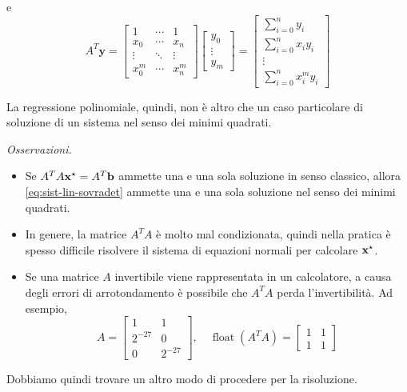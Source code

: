 e
\[
A^T\mathbf y=\begin{bmatrix}
        1 & \cdots & 1 \\
        x_0 & \cdots & x_n \\
        \vdots & \ddots & \vdots \\
        x_0^m & \cdots & x_n^m
    \end{bmatrix}\begin{bmatrix}
        y_0\\
        \vdots\\
        y_m
    \end{bmatrix}=\begin{bmatrix}
\sum ^{n}_{i=0} y_{i}\\
\sum ^{n}_{i=0} x_{i} y_{i}\\
\vdots \\
\sum ^{n}_{i=0} x^{m}_{i} y_{i}
\end{bmatrix}
\]

La regressione polinomiale, quindi, non è altro che un caso particolare di soluzione di un sistema nel senso dei minimi quadrati.

\textit{Osservazioni.}
\begin{itemize}
    \item Se $A^{T} A\mathbf{x}^{\star } =A^{T}\mathbf{b}$ ammette una e una sola soluzione in senso classico, allora \eqref{eq:sist-lin-sovradet} ammette una e una sola soluzione nel senso dei minimi quadrati.
    \item In genere, la matrice $A^{T} A$ è molto mal condizionata, quindi nella pratica è spesso difficile risolvere il sistema di equazioni normali per calcolare $\mathbf{x}^{\star }$.
    \item Se una matrice $A$ invertibile viene rappresentata in un calcolatore, a causa degli errori di arrotondamento è possibile che $A^TA$ perda l'invertibilità. Ad esempio,
    \[
        A = \begin{bmatrix}
            1 & 1 \\
            2^{-27} & 0 \\
            0 & 2^{-27}
        \end{bmatrix},\quad \operatorname{float}(A^T A)=\begin{bmatrix}
            1 & 1\\
            1 & 1
        \end{bmatrix}
    \]
\end{itemize}
Dobbiamo quindi trovare un altro modo di procedere per la risoluzione.
